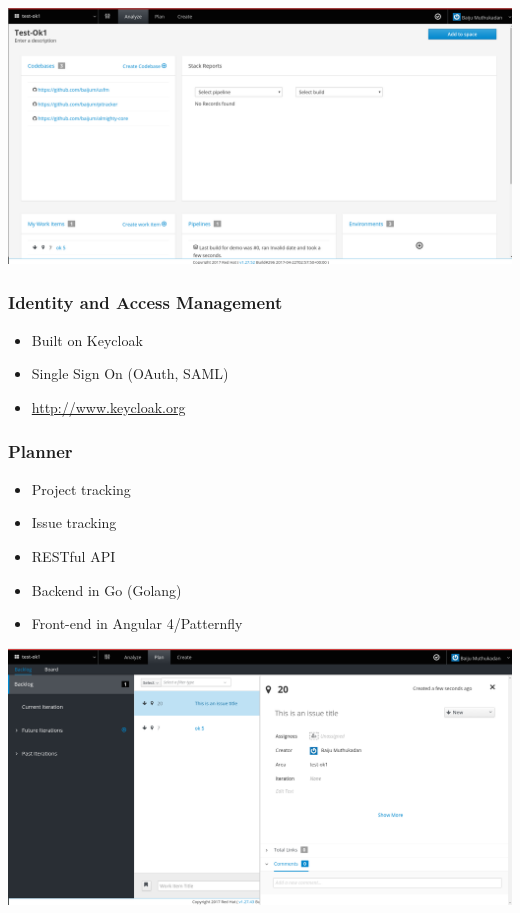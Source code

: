 \documentclass[aspectratio=169]{beamer}
\begin{document}
\begin{frame}
\includegraphics[scale=.27]{images/space.png}
\end{frame}

\begin{frame}
  \frametitle{Identity and Access Management}

  \begin{itemize}
  \item<1-> Built on Keycloak
  \item<2-> Single Sign On (OAuth, SAML)
  \item<3-> \url{http://www.keycloak.org}
  \end{itemize}

\end{frame}

\begin{frame}
  \frametitle{Planner}

  \begin{itemize}
  \item<1-> Project tracking
  \item<2-> Issue tracking
  \item<3-> RESTful API
  \item<4-> Backend in Go (Golang)
  \item<5-> Front-end in Angular 4/Patternfly
  \end{itemize}

\end{frame}

\begin{frame}
\includegraphics[scale=.2]{images/planner.png}
\end{frame}
\end{document}
